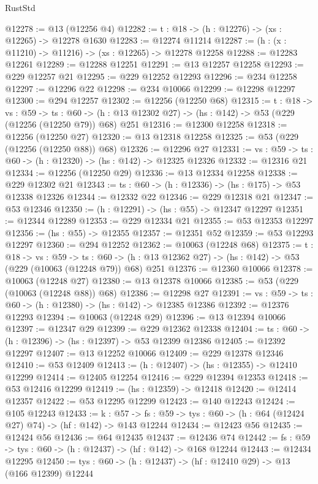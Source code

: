\begin{lexlean}{RustStd}
\begin{coremodule}
@12278 := @13 (@12256 @4)
@12282 := {t : @18} -> (h : @12276) -> (xs : @12265) -> @12278 @1630
@12283 := @12274 @11214
@12287 := (h : (x : @11210) -> @11216) -> (xs : @12265) -> @12278 @12258
@12288 := @12283 @12261
@12289 := @12288 @12251
@12291 := @13 @12257 @12258
@12293 := @229 @12257 @21
@12295 := @229 @12252 @12293
@12296 := @234 @12258
@12297 := @12296 @22
@12298 := @234 @10066
@12299 := @12298 @12297
@12300 := @294 @12257
@12302 := @12256 (@12250 @68)
@12315 := {t : @18} ->
  {vs : @59} ->
  {ts : @60} -> (h : @13 @12302 @27) -> (hs : @142) -> @53 (@229 (@12256 (@12250 @79)) @68) @251
@12316 := @12300 @12258
@12318 := @12256 (@12250 @27)
@12320 := @13 @12318 @12258
@12325 := @53 (@229 (@12256 (@12250 @88)) @68)
@12326 := @12296 @27
@12331 := {vs : @59} -> {ts : @60} -> (h : @12320) -> (hs : @142) -> @12325 @12326
@12332 := @12316 @21
@12334 := @12256 (@12250 @29)
@12336 := @13 @12334 @12258
@12338 := @229 @12302 @21
@12343 := {ts : @60} -> (h : @12336) -> (hs : @175) -> @53 @12338 @12326
@12344 := @12332 @22
@12346 := @229 @12318 @21
@12347 := @53 @12346
@12350 := (h : @12291) -> (hs : @55) -> @12347 @12297
@12351 := @12344 @12289
@12353 := @229 @12334 @21
@12355 := @53 @12353 @12297
@12356 := (hs : @55) -> @12355
@12357 := @12351 @52
@12359 := @53 @12293 @12297
@12360 := @294 @12252
@12362 := @10063 (@12248 @68)
@12375 := {t : @18} ->
  {vs : @59} ->
  {ts : @60} -> (h : @13 @12362 @27) -> (hs : @142) -> @53 (@229 (@10063 (@12248 @79)) @68) @251
@12376 := @12360 @10066
@12378 := @10063 (@12248 @27)
@12380 := @13 @12378 @10066
@12385 := @53 (@229 (@10063 (@12248 @88)) @68)
@12386 := @12298 @27
@12391 := {vs : @59} -> {ts : @60} -> (h : @12380) -> (hs : @142) -> @12385 @12386
@12392 := @12376 @12293
@12394 := @10063 (@12248 @29)
@12396 := @13 @12394 @10066
@12397 := @12347 @29
@12399 := @229 @12362 @12338
@12404 := {ts : @60} -> (h : @12396) -> (hs : @12397) -> @53 @12399 @12386
@12405 := @12392 @12297
@12407 := @13 @12252 @10066
@12409 := @229 @12378 @12346
@12410 := @53 @12409
@12413 := (h : @12407) -> (hs : @12355) -> @12410 @12299
@12414 := @12405 @12254
@12416 := @229 @12394 @12353
@12418 := @53 @12416 @12299
@12419 := (hs : @12359) -> @12418
@12420 := @12414 @12357
@12422 := @53 @12295 @12299
@12423 := @140 @12243
@12424 := @105 @12243
@12433 := {k : @57} ->
  {fs : @59} -> {tys : @60} -> (h : @64 (@12424 @27) @74) -> (hf : @142) -> @143 @12244
@12434 := @12423 @56
@12435 := @12424 @56
@12436 := @64 @12435
@12437 := @12436 @74
@12442 := {fs : @59} -> {tys : @60} -> (h : @12437) -> (hf : @142) -> @168 @12244
@12443 := @12434 @12295
@12450 := {tys : @60} -> (h : @12437) -> (hf : @12410 @29) -> @13 (@166 @12399) @12244

\end{coremodule}
\end{lexlean}
